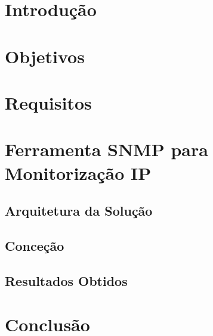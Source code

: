 \documentclass[12pt,a4paper,table]{report}
\begin{document}
 



{
\tableofcontents
{}
}

{
\let\origaddvspace\addvspace
 \renewcommand{\addvspace}[1]{}
 \listoffigures
 \listoftables
 \lstlistoflistings
 \renewcommand{\addvspace}[1]{\origaddvspace{#1}}
 }
 
\chapter{Introdução}


\chapter{Objetivos}


\chapter{Requisitos}


\chapter{Ferramenta SNMP para Monitorização IP}


\section{Arquitetura da Solução}


\section{Conceção}


\section{Resultados Obtidos}


\chapter{Conclusão}


\restoregeometry
\end{document}
